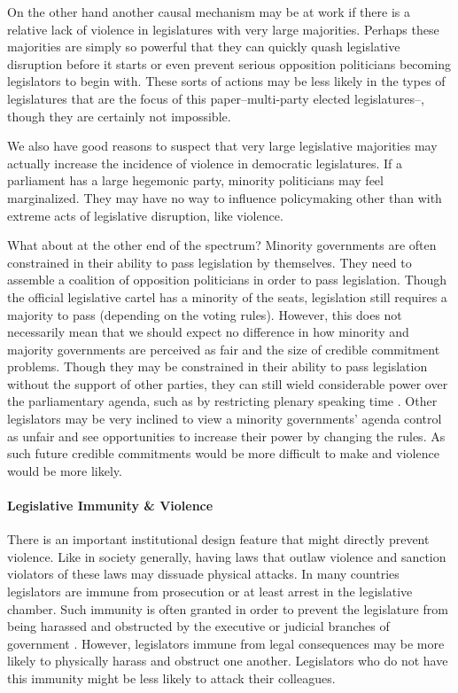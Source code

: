 \documentclass[a4paper]{article}\usepackage[]{graphicx}\usepackage[]{color}
\begin{document}
On the other hand another causal mechanism may be at work if there is a relative lack of violence in legislatures with very large majorities. Perhaps these majorities are simply so powerful that they can quickly quash legislative disruption before it starts or even prevent serious opposition politicians becoming legislators to begin with. These sorts of actions may be less likely in the types of legislatures that are the focus of this paper--multi-party elected legislatures--, though they are certainly not impossible. 

We also have good reasons to suspect that very large legislative majorities may actually increase the incidence of violence in democratic legislatures. If a parliament has a large hegemonic party, minority politicians may feel marginalized. They may have no way to influence policymaking other than with extreme acts of legislative disruption, like violence.

What about at the other end of the spectrum? Minority governments are often constrained in their ability to pass legislation by themselves. They need to assemble a coalition of opposition politicians in order to pass legislation. Though the official legislative cartel has a minority of the seats, legislation still requires a majority to pass (depending on the voting rules). However, this does not necessarily mean that we should expect no difference in how minority and majority governments are perceived as fair and the size of credible commitment problems. Though they may be constrained in their ability to pass legislation without the support of other parties, they can still wield considerable power over the parliamentary agenda, such as by restricting plenary speaking time \citep{Tsebelis2002,cox2005,cox2007}. Other legislators may be very inclined to view a minority governments' agenda control as unfair and see opportunities to increase their power by changing the rules. As such future credible commitments would be more difficult to make and violence would be more likely. 

\paragraph{Legislative Immunity \& Violence}

There is an important institutional design feature that might directly prevent violence. Like in society generally, having laws that outlaw violence and sanction violators of these laws may dissuade physical attacks. In many countries legislators are immune from prosecution or at least arrest in the legislative chamber. Such immunity is often granted in order to prevent the legislature from being harassed and obstructed by the executive or judicial branches of government  \citep{Seghetti1984}. However, legislators immune from legal consequences may be more likely to physically harass and obstruct one another. Legislators who do not have this immunity might be less likely to attack their colleagues. 
\end{document}
